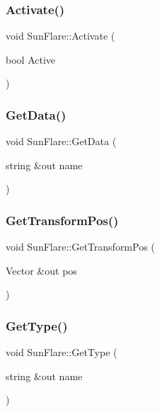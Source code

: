 \subsubsection{\texorpdfstring{Activate()}{Activate()}}
{\footnotesize\ttfamily void Sun\+Flare\+::\+Activate (\begin{DoxyParamCaption}\item[{bool}]{Active }\end{DoxyParamCaption})}

\hypertarget{class_sun_flare_ad10f9eb714e67064dc3cc428888b1cc2}{}\label{class_sun_flare_ad10f9eb714e67064dc3cc428888b1cc2} 
\subsubsection{\texorpdfstring{Get\+Data()}{GetData()}}
{\footnotesize\ttfamily void Sun\+Flare\+::\+Get\+Data (\begin{DoxyParamCaption}\item[{string \&out}]{name }\end{DoxyParamCaption})}

\hypertarget{class_sun_flare_a7f320b220f2aa5d9971d20cce280f772}{}\label{class_sun_flare_a7f320b220f2aa5d9971d20cce280f772} 
\subsubsection{\texorpdfstring{Get\+Transform\+Pos()}{GetTransformPos()}}
{\footnotesize\ttfamily void Sun\+Flare\+::\+Get\+Transform\+Pos (\begin{DoxyParamCaption}\item[{Vector \&out}]{pos }\end{DoxyParamCaption})}

\hypertarget{class_sun_flare_af4522c541902e2d92256b6ed67357715}{}\label{class_sun_flare_af4522c541902e2d92256b6ed67357715} 
\subsubsection{\texorpdfstring{Get\+Type()}{GetType()}}
{\footnotesize\ttfamily void Sun\+Flare\+::\+Get\+Type (\begin{DoxyParamCaption}\item[{string \&out}]{name }\end{DoxyParamCaption})}

